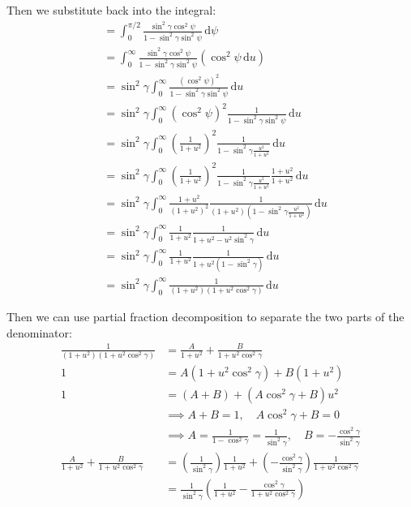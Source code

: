 \documentclass[titlepage]{article}
\begin{document}
Then we substitute back into the integral:
\begin{equation}
	\begin{split}
		&=\int_{0}^{\pi/2}\frac{\sin^2\gamma\cos^2\psi}{1-\sin^2\gamma\sin^2\psi}\,\mathrm{d}\psi \\
		&=\int_{0}^{\infty}\frac{\sin^2\gamma\cos^2\psi}{1-\sin^2\gamma\sin^2\psi}\left(\cos^2\psi\,\mathrm{d}u\right) \\
		&=\sin^2\gamma\int_{0}^{\infty}\frac{(\cos^2\psi)^2}{1-\sin^2\gamma\sin^2\psi}\,\mathrm{d}u \\
		&=\sin^2\gamma\int_{0}^{\infty}\left(\cos^2\psi\right)^2\frac{1}{1-\sin^2\gamma\sin^2\psi}\,\mathrm{d}u \\
		&=\sin^2\gamma\int_{0}^{\infty}\left(\frac{1}{1+u^2}\right)^2\frac{1}{1-\sin^2\gamma\frac{u^2}{1+u^2}}\,\mathrm{d}u \\
		&=\sin^2\gamma\int_{0}^{\infty}\left(\frac{1}{1+u^2}\right)^2\frac{1}{1-\sin^2\gamma\frac{u^2}{1+u^2}}\frac{1+u^2}{1+u^2}\,\mathrm{d}u \\
		&=\sin^2\gamma\int_{0}^{\infty}\frac{1+u^2}{\left(1+u^2\right)^2}\frac{1}{(1+u^2)(1-\sin^2\gamma\frac{u^2}{1+u^2})}\,\mathrm{d}u \\
		&=\sin^2\gamma\int_{0}^{\infty}\frac{1}{1+u^2}\frac{1}{1+u^2-u^2\sin^2\gamma}\,\mathrm{d}u \\
		&=\sin^2\gamma\int_{0}^{\infty}\frac{1}{1+u^2}\frac{1}{1+u^2\left(1-\sin^2\gamma\right)}\,\mathrm{d}u \\
		&=\sin^2\gamma\int_{0}^{\infty}\frac{1}{(1+u^2)(1+u^2\cos^2\gamma)}\,\mathrm{d}u
	\end{split}
\end{equation}

Then we can use partial fraction decomposition to separate the two parts of the denominator:
\begin{equation}
	\begin{split}
		\frac{1}{(1+u^2)(1+u^2\cos^2\gamma)}&=\frac{A}{1+u^2}+\frac{B}{1+u^2\cos^2\gamma} \\
		1&=A\left(1+u^2\cos^2\gamma\right)+B\left(1+u^2\right) \\
		1&=(A+B)+(A\cos^2\gamma+B)u^2 \\
		&\implies A+B=1,\quad A\cos^2\gamma+B=0 \\
		&\implies A=\frac{1}{1-\cos^2\gamma}=\frac{1}{\sin^2\gamma},\quad B=-\frac{\cos^2\gamma}{\sin^2\gamma} \\
		\frac{A}{1+u^2}+\frac{B}{1+u^2\cos^2\gamma}&=\left(\frac{1}{\sin^2\gamma}\right)\frac{1}{1+u^2}+\left(-\frac{\cos^2\gamma}{\sin^2\gamma}\right)\frac{1}{1+u^2\cos^2\gamma} \\
		&=\frac{1}{\sin^2\gamma}\left(\frac{1}{1+u^2}-\frac{\cos^2\gamma}{1+u^2\cos^2\gamma}\right)
	\end{split}
\end{equation}
\end{document}
